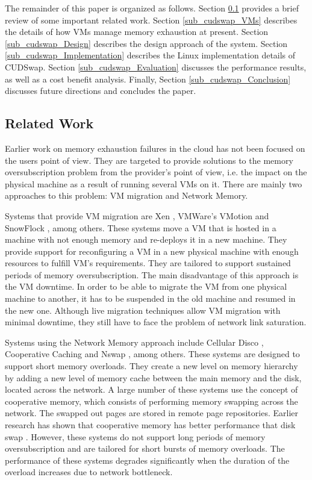 The remainder of this paper is organized as follows. Section \ref{sub_cudswap_Work}
provides a brief review of some important related work. Section \ref{sub_cudswap_VMs}
describes the details of how VMs manage memory exhaustion at present.
Section \ref{sub_cudswap_Design} describes the design approach of the system.
Section \ref{sub_cudswap_Implementation} describes the Linux implementation details of
CUDSwap. Section \ref{sub_cudswap_Evaluation} discusses the performance results, as well
as a cost benefit analysis. Finally, Section \ref{sub_cudswap_Conclusion} discusses
future directions and concludes the paper.

\subsection{Related Work}\label{sub_cudswap_Work}

Earlier work on memory exhaustion failures in the cloud has not been
focused on the users point of view. They are targeted to provide solutions
to the memory oversubscription problem from the provider's point of view,
i.e. the impact on the physical machine as a result of running several VMs
on it. There are mainly two approaches to this problem: VM migration and
Network Memory.

Systems that provide VM migration are Xen \cite{Barham2003},
VMWare's VMotion \cite{Nelson2005} and SnowFlock \cite{Lagar-Cavilla2009},
among others. These systems move a VM that is hosted in a machine with not
enough memory and re-deploys it in a new machine. They provide support for
reconfiguring a VM in a new physical machine with enough resources to
fulfill VM's requirements. They are tailored to support sustained periods of
memory oversubscription. The main disadvantage of this approach is the VM
downtime. In order to be able to migrate the VM from one physical machine
to another, it has to be suspended in the old machine and resumed in the
new one. Although live migration techniques allow VM migration with minimal
downtime, they still have to face the problem of network link saturation.

Systems using the Network Memory approach include Cellular Disco
\cite{Govil2000}, Cooperative Caching \cite{Dahlin1994} and Nswap
\cite{Newhall2003}, among others. These systems are designed to
support short memory overloads. They create a new level on memory hierarchy by
adding a new level of memory cache between the main memory and the disk,
located across the network. A large number of these systems use the concept
of cooperative memory, which consists of performing memory swapping across
the network. The swapped out pages are stored in remote page repositories.
Earlier research has shown that cooperative memory has better performance
that disk swap \cite{Anderson1995}. However, these systems do not support
long periods of memory oversubscription and are tailored for short bursts
of memory overloads. The performance of these
systems degrades significantly when the duration of the overload increases
due to network bottleneck.

